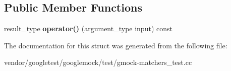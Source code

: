 \subsection*{Public Member Functions}
\begin{DoxyCompactItemize}
\item 
\mbox{\label{structtesting_1_1gmock__matchers__test_1_1_functor_a5beee965d62e6bc1d591163659bad913}} 
result\+\_\+type {\bfseries operator()} (argument\+\_\+type input) const
\end{DoxyCompactItemize}


The documentation for this struct was generated from the following file\+:\begin{DoxyCompactItemize}
\item 
vendor/googletest/googlemock/test/gmock-\/matchers\+\_\+test.\+cc\end{DoxyCompactItemize}
